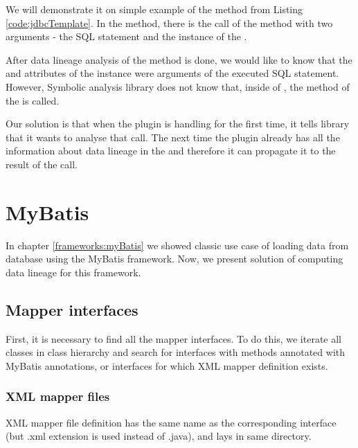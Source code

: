 We will demonstrate it on simple example of the  method from Listing \ref{code:jdbcTemplate}.
In the method, there is the call of the  method
with two arguments - the SQL statement and the instance of the\break
{}.

After data lineage analysis of the  method is done, we would like to know
that the  and  attributes of the  instance
were arguments of the executed SQL statement.
However, Symbolic analysis library does not know that, inside of ,
the  method of the  is called.

Our solution is that when the plugin is handling
 for the first time, it tells library
that it wants to analyse that  call.
The next time the plugin already has all the information
about data lineage in the 
and therefore it can propagate it to the result of the\break
{} call.




\section{MyBatis}

In chapter \ref{frameworks:myBatis} we showed classic use case of loading data from database
using the MyBatis framework. Now, we present solution of computing data lineage for this framework.



\subsection{Mapper interfaces}

First, it is necessary to find all the mapper interfaces.
To do this, we iterate all classes in class hierarchy and search 
for interfaces with methods annotated with MyBatis annotations,
or interfaces for which XML mapper definition exists.



\subsubsection{XML mapper files}

XML mapper file definition has the same name as the corresponding interface
(but .xml extension is used instead of .java), and lays in same directory.

